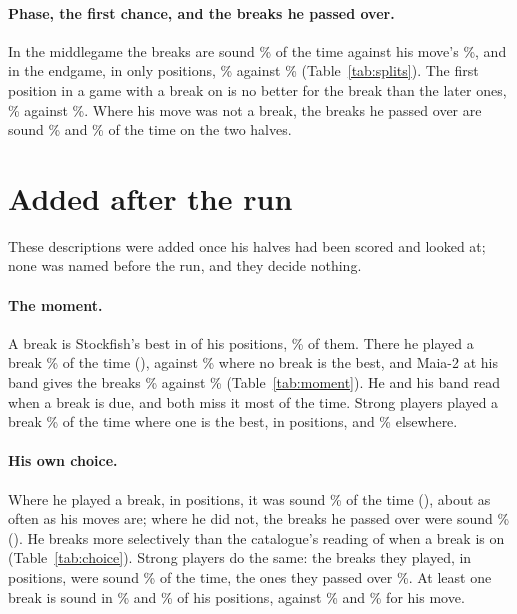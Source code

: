 \documentclass[11pt]{article}
\begin{document}
\SplitTable

\paragraph{Phase, the first chance, and the breaks he passed over.} In the middlegame the breaks
are sound \MidB\% of the time against his move's \MidA\%, and in the endgame, in only \EndN{}
positions, \EndB\% against \EndA\% (Table~\ref{tab:splits}). The first position in a game with a
break on is no better for the break than the later ones, \FirstB\% against \LaterB\%. Where his move was not a break, the breaks he
passed over are sound \NotPlayedBFirst\% and \NotPlayedBSecond\% of the time on the two halves.

\section{Added after the run}

These descriptions were added once his halves had been scored and looked at; none was named before
the run, and they decide nothing.

\MomentTable

\paragraph{The moment.} A break is Stockfish's best in \BestN{} of his positions, \BestShare\% of
them. There he played a break \BestPlayed\% of the time (\BestPlayedCi), against \NotBestPlayed\%
where no break is the best, and Maia-2 at his band gives the breaks \BestMass\% against
\NotBestMass\% (Table~\ref{tab:moment}). He and his band read when a break is due, and both miss it
most of the time. Strong players played a break \StrongBestPlayed\% of the time where one is the
best, in \StrongBestN{} positions, and \StrongNotBestPlayed\% elsewhere.

\ChoiceTable

\paragraph{His own choice.} Where he played a break, in \PlayedN{} positions, it was sound
\PlayedSound\% of the time (\PlayedSoundCi), about as often as his moves are; where he did not,
the breaks he passed over were sound \NotPlayedB\% (\NotPlayedBCi). He breaks more selectively
than the catalogue's reading of when a break is on (Table~\ref{tab:choice}). Strong players do the same: the breaks they
played, in \StrongPlayedN{} positions, were sound \StrongPlayedSound\% of the time, the ones they
passed over \StrongNotPlayedB\%. At least one break is sound in \SomeFirst\% and \SomeSecond\% of
his positions, against \AFirst\% and \ASecond\% for his move.
\end{document}
